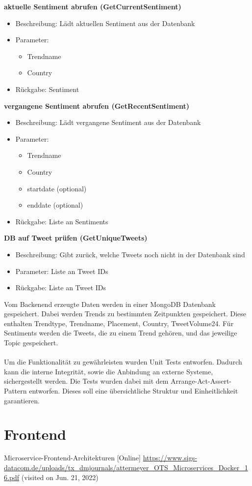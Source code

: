 \documentclass[conference]{IEEEtran}
\begin{document}
\smallskip
\textbf{aktuelle Sentiment abrufen (GetCurrentSentiment)}
\begin{itemize}
    \item Beschreibung: Lädt aktuellen Sentiment aus der Datenbank
    \item Parameter:
        \begin{itemize}
            \item Trendname
            \item Country
        \end{itemize}
    \item Rückgabe: Sentiment
\end{itemize}

\smallskip
\textbf{vergangene Sentiment abrufen (GetRecentSentiment)}
\begin{itemize}
    \item Beschreibung: Lädt vergangene Sentiment aus der Datenbank
    \item Parameter:
        \begin{itemize}
            \item Trendname
            \item Country
            \item startdate (optional)
            \item enddate (optional)
        \end{itemize}
    \item Rückgabe: Liste an Sentiments
\end{itemize}

\smallskip
\textbf{DB auf Tweet prüfen (GetUniqueTweets)}
\begin{itemize}
    \item Beschreibung: Gibt zurück, welche Tweets noch nicht in der Datenbank sind
    \item Parameter: Liste an Tweet IDs
    \item Rückgabe: Liste an Tweet IDs
\end{itemize}


\smallskip

Vom Backenend erzeugte Daten werden in einer MongoDB Datenbank gespeichert. 
Dabei werden Trends zu bestimmten Zeitpunkten gespeichert. Diese enthalten Trendtype, Trendname, Placement, Country, TweetVolume24. Für Sentiments werden die Tweets, die zu einem Trend gehören, und das jeweilige Topic gespeichert.
\\
\\
Um die Funktionalität zu gewährleisten wurden Unit Tests entworfen. Dadurch kann die interne Integrität, sowie die Anbindung an externe Systeme,
sichergestellt werden. Die Tests wurden dabei mit dem Arrange-Act-Assert-Pattern entworfen. Dieses soll eine 
übersichtliche Struktur und Einheitlichkeit garantieren.



\section{Frontend}


\begin{thebibliography}{0}
    Microservice-Frontend-Architekturen [Online] \url{https://www.sigs-datacom.de/uploads/tx_dmjournals/attermeyer_OTS_Microservices_Docker_16.pdf} (visited on Jun. 21, 2022)
\end{thebibliography}
\end{document}
